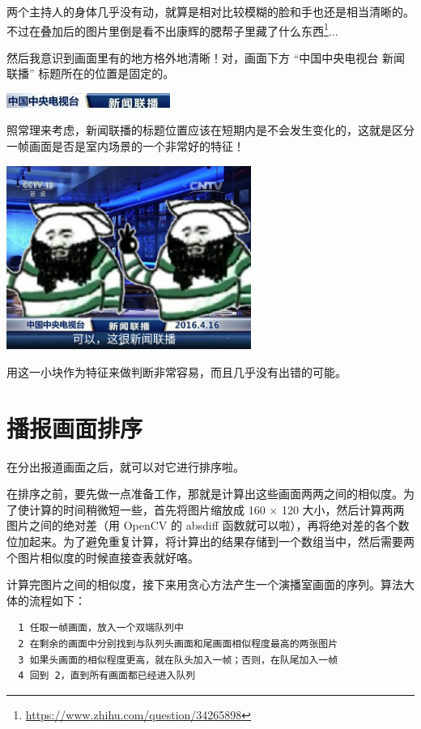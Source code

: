 \documentclass[a4paper, fontset=none]{article}
\begin{document}
两个主持人的身体几乎没有动，就算是相对比较模糊的脸和手也还是相当清晰的。不过在叠加后的图片里倒是看不出康辉的腮帮子里藏了什么东西\footnote{\url{https://www.zhihu.com/question/34265898}}...

然后我意识到画面里有的地方格外地清晰！对，画面下方 ``中国中央电视台 新闻联播'' 标题所在的位置是固定的。


\begin{center}
  \includegraphics[width=0.4\textwidth]{./title.jpg}
\end{center}

照常理来考虑，新闻联播的标题位置应该在短期内是不会发生变化的，这就是区分一帧画面是否是室内场景的一个非常好的特征！

\begin{center}
  \includegraphics[width=0.6\textwidth]{./hehe.jpg}
\end{center}

用这一小块作为特征来做判断非常容易，而且几乎没有出错的可能。


\section{播报画面排序}
\label{sec:播报画面排序}

在分出报道画面之后，就可以对它进行排序啦。

在排序之前，要先做一点准备工作，那就是计算出这些画面两两之间的相似度。为了使计算的时间稍微短一些，首先将图片缩放成 160 $\times$ 120 大小，然后计算两两图片之间的绝对差（用 OpenCV 的 absdiff 函数就可以啦），再将绝对差的各个数位加起来。为了避免重复计算，将计算出的结果存储到一个数组当中，然后需要两个图片相似度的时候直接查表就好咯。

计算完图片之间的相似度，接下来用贪心方法产生一个演播室画面的序列。算法大体的流程如下：

\begin{verbatim}
  1 任取一帧画面，放入一个双端队列中
  2 在剩余的画面中分别找到与队列头画面和尾画面相似程度最高的两张图片
  3 如果头画面的相似程度更高，就在队头加入一帧；否则，在队尾加入一帧
  4 回到 2，直到所有画面都已经进入队列
\end{verbatim}
\end{document}
